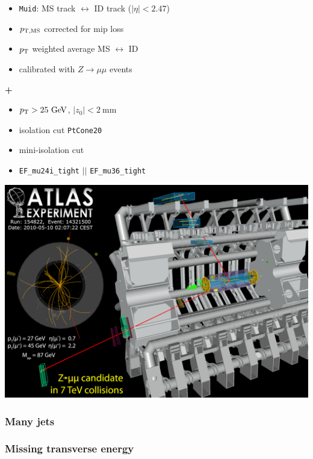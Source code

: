 \begin{frame}
\begin{minipage}{.5\textwidth}
\begin{itemize}
\item \texttt{Muid}: MS track $\leftrightarrow$ ID track ($|\eta|<2.47$)
\item $p_{\rm T,MS}$ corrected for mip loss
\item $p_{\rm T}$ weighted average MS $\leftrightarrow$ ID
\item calibrated with $Z\to \mu\mu$ events
\end{itemize}
{\cccolor \bfseries +}\\
\begin{itemize}
\item $\pt > 25\gev$, $|z_0|<2~$mm
\item isolation cut \texttt{PtCone20}
\item mini-isolation cut
\item \texttt{EF\_mu24i\_tight} $||$ \texttt{EF\_mu36\_tight}
\end{itemize}

\includegraphics[width=.78\textwidth,height=0.3\textheight]{pics/Zmumu}

\end{minipage}


\end{frame}



\begin{frame}\frametitle{Many jets}
\centering\myskip

\end{frame}



\begin{frame}\frametitle{Missing transverse energy}
\centering\myskip

\end{frame}

